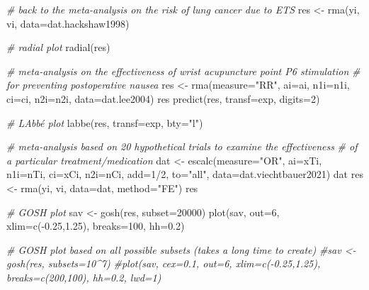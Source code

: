 \documentclass[
]{book}
\newenvironment{Shaded}{\begin{snugshade}}{\end{snugshade}}
\newcommand{\AttributeTok}[1]{\textcolor[rgb]{0.77,0.63,0.00}{#1}}
\newcommand{\CommentTok}[1]{\textcolor[rgb]{0.56,0.35,0.01}{\textit{#1}}}
\newcommand{\DecValTok}[1]{\textcolor[rgb]{0.00,0.00,0.81}{#1}}
\newcommand{\FloatTok}[1]{\textcolor[rgb]{0.00,0.00,0.81}{#1}}
\newcommand{\FunctionTok}[1]{\textcolor[rgb]{0.00,0.00,0.00}{#1}}
\newcommand{\NormalTok}[1]{#1}
\newcommand{\OtherTok}[1]{\textcolor[rgb]{0.56,0.35,0.01}{#1}}
\newcommand{\SpecialCharTok}[1]{\textcolor[rgb]{0.00,0.00,0.00}{#1}}
\newcommand{\StringTok}[1]{\textcolor[rgb]{0.31,0.60,0.02}{#1}}
\begin{document}
\begin{Shaded}
\begin{Highlighting}[]
\CommentTok{\# back to the meta{-}analysis on the risk of lung cancer due to ETS}
\NormalTok{res }\OtherTok{\textless{}{-}} \FunctionTok{rma}\NormalTok{(yi, vi, }\AttributeTok{data=}\NormalTok{dat.hackshaw1998)}

\CommentTok{\# radial plot}
\FunctionTok{radial}\NormalTok{(res)}

\CommentTok{\# meta{-}analysis on the effectiveness of wrist acupuncture point P6 stimulation}
\CommentTok{\# for preventing postoperative nausea}
\NormalTok{res }\OtherTok{\textless{}{-}} \FunctionTok{rma}\NormalTok{(}\AttributeTok{measure=}\StringTok{"RR"}\NormalTok{, }\AttributeTok{ai=}\NormalTok{ai, }\AttributeTok{n1i=}\NormalTok{n1i, }\AttributeTok{ci=}\NormalTok{ci, }\AttributeTok{n2i=}\NormalTok{n2i, }\AttributeTok{data=}\NormalTok{dat.lee2004)}
\NormalTok{res}
\FunctionTok{predict}\NormalTok{(res, }\AttributeTok{transf=}\NormalTok{exp, }\AttributeTok{digits=}\DecValTok{2}\NormalTok{)}

\CommentTok{\# L\textquotesingle{}Abbé plot}
\FunctionTok{labbe}\NormalTok{(res, }\AttributeTok{transf=}\NormalTok{exp, }\AttributeTok{bty=}\StringTok{"l"}\NormalTok{)}

\CommentTok{\# meta{-}analysis based on 20 hypothetical trials to examine the effectiveness}
\CommentTok{\# of a particular treatment/medication}
\NormalTok{dat }\OtherTok{\textless{}{-}} \FunctionTok{escalc}\NormalTok{(}\AttributeTok{measure=}\StringTok{"OR"}\NormalTok{, }\AttributeTok{ai=}\NormalTok{xTi, }\AttributeTok{n1i=}\NormalTok{nTi, }\AttributeTok{ci=}\NormalTok{xCi, }\AttributeTok{n2i=}\NormalTok{nCi,}
              \AttributeTok{add=}\DecValTok{1}\SpecialCharTok{/}\DecValTok{2}\NormalTok{, }\AttributeTok{to=}\StringTok{"all"}\NormalTok{, }\AttributeTok{data=}\NormalTok{dat.viechtbauer2021)}
\NormalTok{dat}
\NormalTok{res }\OtherTok{\textless{}{-}} \FunctionTok{rma}\NormalTok{(yi, vi, }\AttributeTok{data=}\NormalTok{dat, }\AttributeTok{method=}\StringTok{"FE"}\NormalTok{)}
\NormalTok{res}

\CommentTok{\# GOSH plot}
\NormalTok{sav }\OtherTok{\textless{}{-}} \FunctionTok{gosh}\NormalTok{(res, }\AttributeTok{subset=}\DecValTok{20000}\NormalTok{)}
\FunctionTok{plot}\NormalTok{(sav, }\AttributeTok{out=}\DecValTok{6}\NormalTok{, }\AttributeTok{xlim=}\FunctionTok{c}\NormalTok{(}\SpecialCharTok{{-}}\FloatTok{0.25}\NormalTok{,}\FloatTok{1.25}\NormalTok{), }\AttributeTok{breaks=}\DecValTok{100}\NormalTok{, }\AttributeTok{hh=}\FloatTok{0.2}\NormalTok{)}

\CommentTok{\# GOSH plot based on all possible subsets (takes a long time to create)}
\CommentTok{\#sav \textless{}{-} gosh(res, subsets=10\^{}7)}
\CommentTok{\#plot(sav, cex=0.1, out=6, xlim=c({-}0.25,1.25), breaks=c(200,100), hh=0.2, lwd=1)}


\end{Highlighting}
\end{Shaded}
\end{document}
